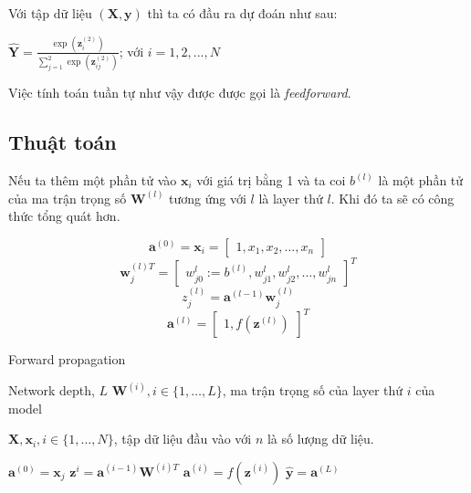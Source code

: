 Với tập dữ liệu $(\textbf{X},\textbf{y} )$ thì ta có đầu ra dự đoán như sau:  
\begin{center}

	$\widehat{\textbf{Y}} =\frac{\exp({\textbf{z}^{(2)}_i})}{\sum^{2}_{j=1}{\exp({\textbf{z}^{(2)}_{ij}})}}$; với $i=1,2,...,N$ 

\end{center}
Việc tính toán tuần tự như vậy được được gọi là \textit{feedforward}.
\subsection{ Thuật toán}
\label{subsec:feedforward}
Nếu ta thêm một phần tử vào $\textbf{x}_i$ với giá trị bằng 1 và ta coi $b^{(l)}$ là một phần tử của ma trận trọng số $\textbf{W}^{(l)}$ tương ứng với $l$ là layer thứ $l$. Khi đó ta sẽ có công thức tổng quát hơn.


\begin{equation*}
\textbf{a}^{(0)}=\textbf{x}_i = \begin{bmatrix}
1,x_1,x_2,\ldots,x_n
\end{bmatrix} 
\end{equation*}
\begin{equation*}
\textbf{w}^{(l)T}_j = \begin{bmatrix}
w^{l}_{j0} := b^{(l)}, w^{l}_{j1}, w^{l}_{j2},\ldots, w^{l}_{jn}
\end{bmatrix}^T
\end{equation*}
\begin{equation*}
z^{(l)}_j = \textbf{a}^{(l-1)}\textbf{w}^{(l)}_j
\end{equation*}
\begin{equation*}
\textbf{a}^{(l)} = \begin{bmatrix}
1, f(\textbf{z}^{(l)})
\end{bmatrix}^T
\end{equation*}




\begin{algorithm}[H]
\caption{Forward propagation }\label{al:forward}
\begin{algorithmic}[1]
\REQUIRE Network depth, $L$
\REQUIRE $\textbf{W}^{(i)}, i \in \{1,\ldots,L\}$, ma trận trọng số của layer thứ $i$ của model

\REQUIRE $\textbf{X}, \textbf{x}_i, i \in \{1,\ldots,N\} $, tập dữ liệu đầu vào với $n$ là số lượng dữ liệu.
	
	\STATE $\textbf{a}^{(0)} = \textbf{x}_j$
		\STATE $\textbf{z}^{i}=\textbf{a}^{(i-1)} \textbf{W}^{(i)T}$
		\STATE $\textbf{a}^{(i)}=f(\textbf{z}^{(i)})$
\ENDFOR
\STATE $\widehat{\textbf{y}} = \textbf{a}^{(L)}$
\ENDFOR
\end{algorithmic}
\end{algorithm}







